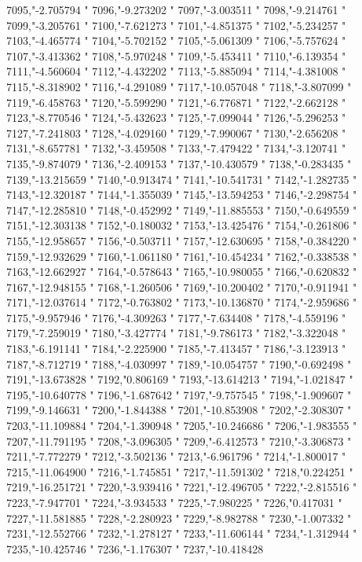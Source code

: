 7095,"-2.705794
"
7096,"-9.273202
"
7097,"-3.003511
"
7098,"-9.214761
"
7099,"-3.205761
"
7100,"-7.621273
"
7101,"-4.851375
"
7102,"-5.234257
"
7103,"-4.465774
"
7104,"-5.702152
"
7105,"-5.061309
"
7106,"-5.757624
"
7107,"-3.413362
"
7108,"-5.970248
"
7109,"-5.453411
"
7110,"-6.139354
"
7111,"-4.560604
"
7112,"-4.432202
"
7113,"-5.885094
"
7114,"-4.381008
"
7115,"-8.318902
"
7116,"-4.291089
"
7117,"-10.057048
"
7118,"-3.807099
"
7119,"-6.458763
"
7120,"-5.599290
"
7121,"-6.776871
"
7122,"-2.662128
"
7123,"-8.770546
"
7124,"-5.432623
"
7125,"-7.099044
"
7126,"-5.296253
"
7127,"-7.241803
"
7128,"-4.029160
"
7129,"-7.990067
"
7130,"-2.656208
"
7131,"-8.657781
"
7132,"-3.459508
"
7133,"-7.479422
"
7134,"-3.120741
"
7135,"-9.874079
"
7136,"-2.409153
"
7137,"-10.430579
"
7138,"-0.283435
"
7139,"-13.215659
"
7140,"-0.913474
"
7141,"-10.541731
"
7142,"-1.282735
"
7143,"-12.320187
"
7144,"-1.355039
"
7145,"-13.594253
"
7146,"-2.298754
"
7147,"-12.285810
"
7148,"-0.452992
"
7149,"-11.885553
"
7150,"-0.649559
"
7151,"-12.303138
"
7152,"-0.180032
"
7153,"-13.425476
"
7154,"-0.261806
"
7155,"-12.958657
"
7156,"-0.503711
"
7157,"-12.630695
"
7158,"-0.384220
"
7159,"-12.932629
"
7160,"-1.061180
"
7161,"-10.454234
"
7162,"-0.338538
"
7163,"-12.662927
"
7164,"-0.578643
"
7165,"-10.980055
"
7166,"-0.620832
"
7167,"-12.948155
"
7168,"-1.260506
"
7169,"-10.200402
"
7170,"-0.911941
"
7171,"-12.037614
"
7172,"-0.763802
"
7173,"-10.136870
"
7174,"-2.959686
"
7175,"-9.957946
"
7176,"-4.309263
"
7177,"-7.634408
"
7178,"-4.559196
"
7179,"-7.259019
"
7180,"-3.427774
"
7181,"-9.786173
"
7182,"-3.322048
"
7183,"-6.191141
"
7184,"-2.225900
"
7185,"-7.413457
"
7186,"-3.123913
"
7187,"-8.712719
"
7188,"-4.030997
"
7189,"-10.054757
"
7190,"-0.692498
"
7191,"-13.673828
"
7192,"0.806169
"
7193,"-13.614213
"
7194,"-1.021847
"
7195,"-10.640778
"
7196,"-1.687642
"
7197,"-9.757545
"
7198,"-1.909607
"
7199,"-9.146631
"
7200,"-1.844388
"
7201,"-10.853908
"
7202,"-2.308307
"
7203,"-11.109884
"
7204,"-1.390948
"
7205,"-10.246686
"
7206,"-1.983555
"
7207,"-11.791195
"
7208,"-3.096305
"
7209,"-6.412573
"
7210,"-3.306873
"
7211,"-7.772279
"
7212,"-3.502136
"
7213,"-6.961796
"
7214,"-1.800017
"
7215,"-11.064900
"
7216,"-1.745851
"
7217,"-11.591302
"
7218,"0.224251
"
7219,"-16.251721
"
7220,"-3.939416
"
7221,"-12.496705
"
7222,"-2.815516
"
7223,"-7.947701
"
7224,"-3.934533
"
7225,"-7.980225
"
7226,"0.417031
"
7227,"-11.581885
"
7228,"-2.280923
"
7229,"-8.982788
"
7230,"-1.007332
"
7231,"-12.552766
"
7232,"-1.278127
"
7233,"-11.606144
"
7234,"-1.312944
"
7235,"-10.425746
"
7236,"-1.176307
"
7237,"-10.418428
